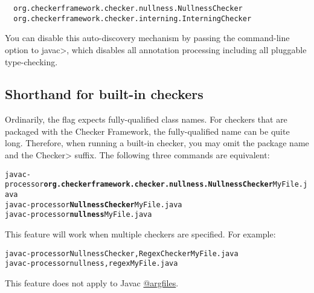 \begin{smaller}
\begin{Verbatim}
  org.checkerframework.checker.nullness.NullnessChecker
  org.checkerframework.checker.interning.InterningChecker
\end{Verbatim}
\end{smaller}

You can disable this auto-discovery mechanism by passing the
 command-line option to \<javac>, which disables all
annotation processing including all pluggable type-checking.


\subsection{Shorthand for built-in checkers \label{shorthand-for-checkers}}


Ordinarily, the  flag expects fully-qualified class names.
For checkers that are packaged with the Checker Framework, the fully-qualified
name can be quite long.  Therefore, when running a built-in checker, you may
omit the package name and the \<Checker> suffix.
The following three commands are equivalent:

\begin{alltt}
  javac -processor \textbf{org.checkerframework.checker.nullness.NullnessChecker} MyFile.java
  javac -processor \textbf{NullnessChecker} MyFile.java
  javac -processor \textbf{nullness} MyFile.java
\end{alltt}

This feature will work when multiple checkers are specified.
For example:

\begin{alltt}
  javac -processor NullnessChecker,RegexChecker MyFile.java
  javac -processor nullness,regex MyFile.java
\end{alltt}

This feature does not apply to Javac \href{https://docs.oracle.com/javase/7/docs/technotes/tools/windows/javac.html#commandlineargfile}{@argfiles}.


